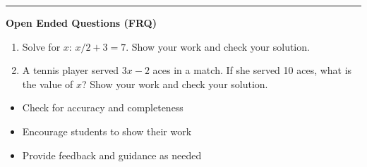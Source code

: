 \documentclass[10pt]{article}
\begin{document}
\vspace{-0.2cm}
\hrule
\vspace{0.2cm}
\textbf{\small Open Ended Questions (FRQ)}
\begin{enumerate}[label=\textbf{Q\arabic*.}, start=9, itemsep=5pt, topsep=0pt]

  \item \small Solve for $x$: $x/2 + 3 = 7$. Show your work and check your solution. \vspace{2cm}

  \item \small A tennis player served $3x - 2$ aces in a match. If she served 10 aces, what is the value of $x$? Show your work and check your solution. \vspace{2cm}

\end{enumerate}

\vfill

\begin{tcolorbox}[colback=blue!5, colframe=mainblue!50, title=\small \textbf{Chef's Tips}, fonttitle=\bfseries, bottom=1mm]
\begin{itemize}[noitemsep, topsep=2pt, leftmargin=0.5cm]
  \item \scriptsize Check for accuracy and completeness\item \scriptsize Encourage students to show their work\item \scriptsize Provide feedback and guidance as needed
\end{itemize}
\end{tcolorbox}
\end{document}
